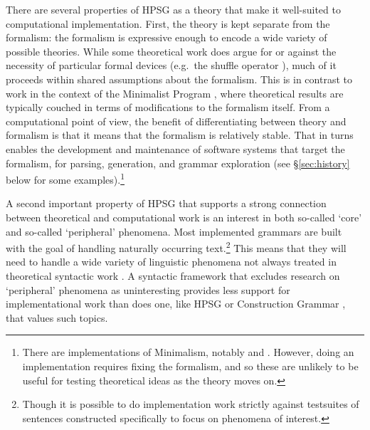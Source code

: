 \documentclass[output=paper]{langsci/langscibook}
\begin{document}
There are several properties of HPSG as a theory that make it well-suited to computational implementation. First, the theory is kept separate from the formalism: the formalism is expressive enough to encode a wide variety of possible theories. While some theoretical work does argue for or against the necessity of particular formal devices (e.g.\ the shuffle operator \cite{FIXME-Reape}), much of it proceeds within shared assumptions about the formalism. This is in contrast to work in the context of the Minimalist Program \cite{Chomsky93b-u}, where theoretical results are typically couched in terms of modifications to the formalism itself. From a computational point of view, the benefit of differentiating between theory and formalism is that it means that the formalism is relatively stable. That in turns enables the development and maintenance of software systems that target the formalism, for parsing, generation, and grammar exploration (see \S\ref{sec:history} below for some examples).\footnote{There are implementations of Minimalism, notably \cite{FIXME-Stabler} and \cite{FIXME-Indianadiss}. However, doing an implementation requires fixing the formalism, and so these are unlikely to be useful for testing theoretical ideas as the theory moves on.}

A second important property of HPSG that supports a strong connection between theoretical and computational work is an interest in both so-called `core' and so-called `peripheral' phenomena. Most implemented grammars are built with the goal of handling naturally occurring text.\footnote{Though it is possible to do implementation work strictly against testsuites of sentences constructed specifically to focus on phenomena of interest.} This means that they will need to handle a wide variety of linguistic phenomena not always treated in theoretical syntactic work \cite{FIXME-Baldwin-et-al-Beauty}. A syntactic framework that excludes research on `peripheral' phenomena as uninteresting provides less support for implementational work than does one, like HPSG or Construction Grammar \cite{FIXME}, that values such topics.
\end{document}
